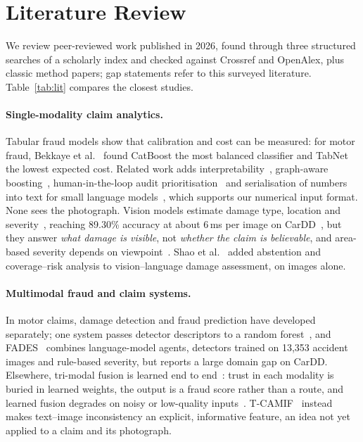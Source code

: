 \section{Literature Review}\label{sec:litreview}

We review peer-reviewed work published in 2026, found through three structured searches of a scholarly index and checked against Crossref and OpenAlex, plus classic method papers; gap statements refer to this surveyed literature. Table~\ref{tab:lit} compares the closest studies.

\paragraph{Single-modality claim analytics.}
Tabular fraud models show that calibration and cost can be measured: for motor fraud, Bekkaye et al.~\cite{bekkaye2026} found CatBoost the most balanced classifier and TabNet the lowest expected cost. Related work adds interpretability~\cite{ebinezer2026}, graph-aware boosting~\cite{vandervorst2026}, human-in-the-loop audit prioritisation~\cite{huang2026} and serialisation of numbers into text for small language models~\cite{slm2026}, which supports our numerical input format. None sees the photograph. Vision models estimate damage type, location and severity~\cite{ouf2026,li2026part,dalal2026}, reaching 89.30\% accuracy at about 6\,ms per image on CarDD~\cite{wang2023cardd,cheng2026}, but they answer \emph{what damage is visible}, not \emph{whether the claim is believable}, and area-based severity depends on viewpoint~\cite{li2026part}. Shao et al.~\cite{shao2026} added abstention and coverage--risk analysis to vision--language damage assessment, on images alone.

\paragraph{Multimodal fraud and claim systems.}
In motor claims, damage detection and fraud prediction have developed separately; one system passes detector descriptors to a random forest~\cite{subhash2026}, and FADES~\cite{arconzo2026} combines language-model agents, detectors trained on 13,353 accident images and rule-based severity, but reports a large domain gap on CarDD. Elsewhere, tri-modal fusion is learned end to end~\cite{nazir2026,ping2026,tatavarthi2026}: trust in each modality is buried in learned weights, the output is a fraud score rather than a route, and learned fusion degrades on noisy or low-quality inputs~\cite{zhang2026fusion}. T-CAMIF~\cite{akhtar2026} instead makes text--image inconsistency an explicit, informative feature, an idea not yet applied to a claim and its photograph.

